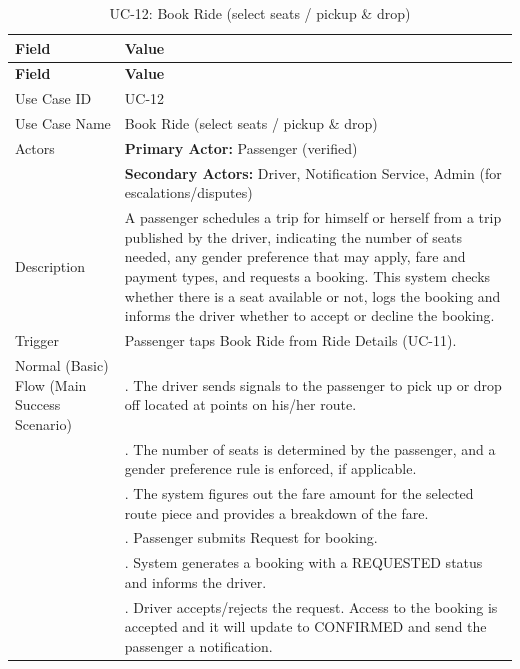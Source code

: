 \begin{longtable}{|>{\raggedright\arraybackslash}p{4cm}|>{\raggedright\arraybackslash}p{11cm}|}
\caption{UC-12: Book Ride (select seats / pickup \& drop)}
\label{tab:uc-12} \\
\hline
\rowcolor{lightgray!30}
\textbf{Field} & \textbf{Value} \\
\hline
\endfirsthead
\hline
\rowcolor{lightgray!30}
\textbf{Field} & \textbf{Value} \\
\hline
\endhead
\hline
\endfoot
\hline
\endlastfoot
Use Case ID & UC-12 \\
\hline
Use Case Name & Book Ride (select seats / pickup \& drop) \\
\hline
Actors & \textbf{Primary Actor:} Passenger (verified) \\
& \textbf{Secondary Actors:} Driver, Notification Service, Admin (for escalations/disputes) \\
\hline
Description & A passenger schedules a trip for himself or herself from a trip published by the driver, indicating the number of seats needed, any gender preference that may apply, fare and payment types, and requests a booking. This system checks whether there is a seat available or not, logs the booking and informs the driver whether to accept or decline the booking. \\
\hline
Trigger & Passenger taps Book Ride from Ride Details (UC-11). \\
\hline
Normal (Basic) Flow (Main Success Scenario) 
& 1. The driver sends signals to the passenger to pick up or drop off located at points on his/her route. \\
& 2. The number of seats is determined by the passenger, and a gender preference rule is enforced, if applicable. \\
& 3. The system figures out the fare amount for the selected route piece and provides a breakdown of the fare. \\
& 4. Passenger submits Request for booking. \\
& 5. System generates a booking with a REQUESTED status and informs the driver. \\
& 6. Driver accepts/rejects the request. Access to the booking is accepted and it will update to CONFIRMED and send the passenger a notification. \\

\end{longtable}
